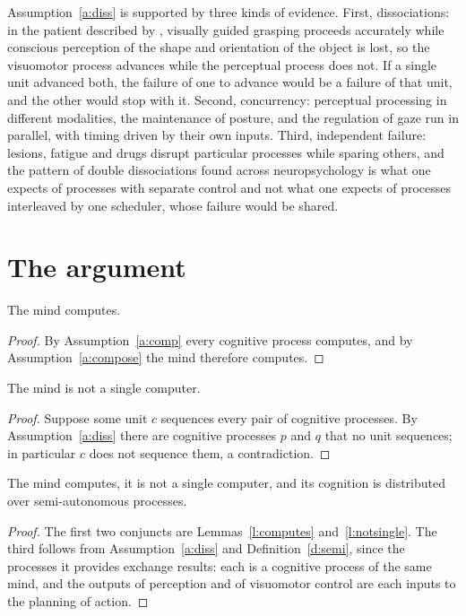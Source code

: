 \documentclass{situationist-preprint}
\begin{document}
Assumption~\ref{a:diss} is supported by three kinds of evidence. First, dissociations: in the patient described by \citet{MilnerGoodale1995}, visually guided grasping proceeds accurately while conscious perception of the shape and orientation of the object is lost, so the visuomotor process advances while the perceptual process does not. If a single unit advanced both, the failure of one to advance would be a failure of that unit, and the other would stop with it. Second, concurrency: perceptual processing in different modalities, the maintenance of posture, and the regulation of gaze run in parallel, with timing driven by their own inputs. Third, independent failure: lesions, fatigue and drugs disrupt particular processes while sparing others, and the pattern of double dissociations found across neuropsychology is what one expects of processes with separate control and not what one expects of processes interleaved by one scheduler, whose failure would be shared.

\section{The argument}

\begin{lemma}\label{l:computes}
The mind computes.
\end{lemma}

\begin{proof}
By Assumption~\ref{a:comp} every cognitive process computes, and by Assumption~\ref{a:compose} the mind therefore computes.
\end{proof}

\begin{lemma}\label{l:notsingle}
The mind is not a single computer.
\end{lemma}

\begin{proof}
Suppose some unit $c$ sequences every pair of cognitive processes. By Assumption~\ref{a:diss} there are cognitive processes $p$ and $q$ that no unit sequences; in particular $c$ does not sequence them, a contradiction.
\end{proof}

\begin{theorem}\label{t:main}
The mind computes, it is not a single computer, and its cognition is distributed over semi-autonomous processes.
\end{theorem}

\begin{proof}
The first two conjuncts are Lemmas~\ref{l:computes} and~\ref{l:notsingle}. The third follows from Assumption~\ref{a:diss} and Definition~\ref{d:semi}, since the processes it provides exchange results: each is a cognitive process of the same mind, and the outputs of perception and of visuomotor control are each inputs to the planning of action.
\end{proof}
\end{document}
